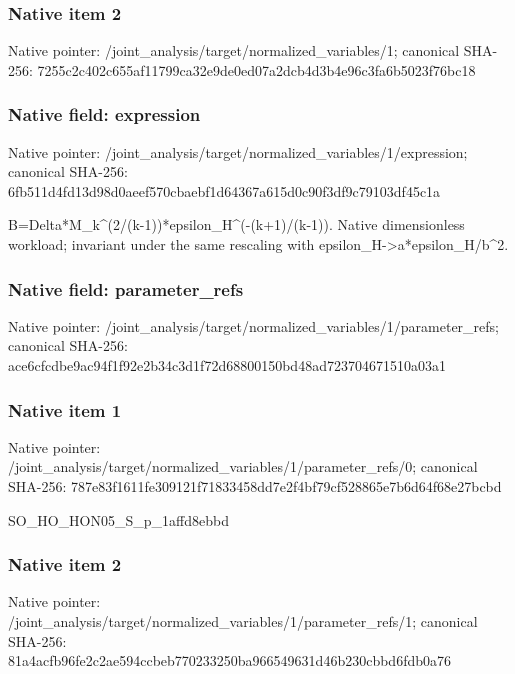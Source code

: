 \documentclass[10pt,a4paper]{article}
\begin{document}
\subsubsection{Native item 2}
Native pointer: /joint\_\allowbreak{}analysis/target/normalized\_\allowbreak{}variables/1; canonical SHA-256: 7255c2c402c655af11799ca32e9de0ed07a2dcb4d3b4e96c3fa6b5023f76bc18

\subsubsection{Native field: expression}
Native pointer: /joint\_\allowbreak{}analysis/target/normalized\_\allowbreak{}variables/1/expression; canonical SHA-256: 6fb511d4fd13d98d0aeef570cbaebf1d64367a615d0c90f3df9c79103df45c1a

\begingroup\raggedright\sloppy B=\allowbreak{}Delta*M\_\allowbreak{}k\textasciicircum{}(2/\allowbreak{}(k-1))*epsilon\_\allowbreak{}H\textasciicircum{}(-(k+1)/\allowbreak{}(k-1)). Native dimensionless workload;\allowbreak{} invariant under the same rescaling with epsilon\_\allowbreak{}H->a*epsilon\_\allowbreak{}H/\allowbreak{}b\textasciicircum{}2.\par\endgroup

\subsubsection{Native field: parameter\_\allowbreak{}refs}
Native pointer: /joint\_\allowbreak{}analysis/target/normalized\_\allowbreak{}variables/1/parameter\_\allowbreak{}refs; canonical SHA-256: ace6cfcdbe9ac94f1f92e2b34c3d1f72d68800150bd48ad723704671510a03a1

\subsubsection{Native item 1}
Native pointer: /joint\_\allowbreak{}analysis/target/normalized\_\allowbreak{}variables/1/parameter\_\allowbreak{}refs/0; canonical SHA-256: 787e83f1611fe309121f71833458dd7e2f4bf79cf528865e7b6d64f68e27bcbd

\begingroup\raggedright\sloppy SO\_\allowbreak{}HO\_\allowbreak{}HON05\_\allowbreak{}S\_\allowbreak{}p\_\allowbreak{}1affd8ebbd\par\endgroup

\subsubsection{Native item 2}
Native pointer: /joint\_\allowbreak{}analysis/target/normalized\_\allowbreak{}variables/1/parameter\_\allowbreak{}refs/1; canonical SHA-256: 81a4acfb96fe2c2ae594ccbeb770233250ba966549631d46b230cbbd6fdb0a76
\end{document}
